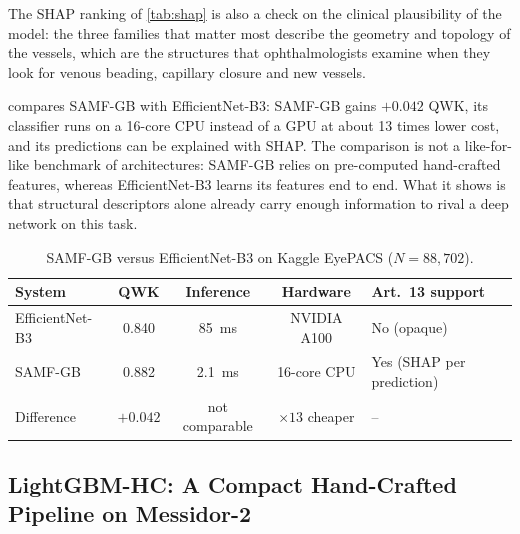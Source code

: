 The SHAP ranking of \cref{tab:shap} is also a check on the clinical plausibility of the
model: the three families that matter most describe the geometry and topology of the
vessels, which are the structures that ophthalmologists examine when they look for venous
beading, capillary closure and new vessels.

 compares SAMF-GB with
EfficientNet-B3: SAMF-GB gains $+0.042$ QWK, its classifier runs on a 16-core CPU instead
of a GPU at about 13 times lower cost, and its predictions can be explained with SHAP. The
comparison is not a like-for-like benchmark of architectures: SAMF-GB relies on
pre-computed hand-crafted features, whereas EfficientNet-B3 learns its features end to end.
What it shows is that structural descriptors alone already carry enough information to
rival a deep network on this task.

\begin{table}[!htbp]
\centering
\caption[SAMF-GB versus EfficientNet-B3 on Kaggle EyePACS]{SAMF-GB versus EfficientNet-B3 on Kaggle EyePACS ($N=88{,}702$).}
\label{tab:samf}
\small
\begin{tabular}{@{}lcccl@{}}
\toprule
System & QWK & Inference & Hardware & Art.~13 support \\
\midrule
EfficientNet-B3 & 0.840 & 85~ms & NVIDIA A100 & No (opaque) \\
SAMF-GB & 0.882 & 2.1~ms & 16-core CPU & Yes (SHAP per prediction) \\
\midrule
Difference & $+0.042$ & not comparable & $\times 13$ cheaper & -- \\
\bottomrule
\end{tabular}
\end{table}

\subsection{LightGBM-HC: A Compact Hand-Crafted Pipeline on Messidor-2}
\label{sec:lgbmhc}

